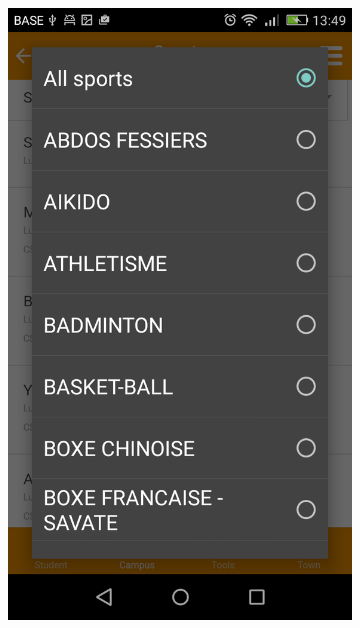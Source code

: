 \documentclass{eplmastersthesis}
\begin{document}
\begin{figure}
\begin{subfigure}[b]{0.3\textwidth}
        \includegraphics[width=\textwidth]{Images/Application_screens/Screenshot_2016-06-06-13-49-55.png}
    \end{subfigure}
\end{figure}
\end{document}
